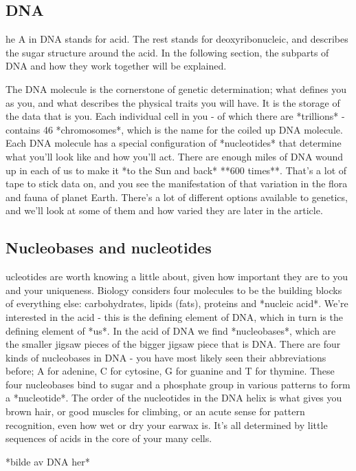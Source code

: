 \subsection*{DNA}
he A in DNA stands for acid. The rest stands for deoxyribonucleic, and describes the sugar structure around the acid. In the following section, the subparts of DNA and how they work together will be explained. 

The DNA molecule is the cornerstone of genetic determination; what defines you as you, and what describes the physical traits you will have.  It is the storage of the data that is you. Each individual cell in you - of which there are *trillions* - contains 46 *chromosomes*, which is the name for the coiled up DNA molecule. Each DNA molecule has a special configuration of *nucleotides* that determine what you'll look like and how you'll act. There are enough miles of DNA wound up in each of us to make it *to the Sun and back* **600 times**. That's a lot of tape to stick data on, and you see the manifestation of that variation in the flora and fauna of planet Earth. There's a lot of different options available to genetics, and we'll look at some of them and how varied they are later in the article. 

\subsection*{Nucleobases and nucleotides}
ucleotides are worth knowing a little about, given how important they are to you and your uniqueness. Biology considers four molecules to be the building blocks of everything else: carbohydrates, lipids (fats), proteins and *nucleic acid*. We're interested in the acid - this is the defining element of DNA, which in turn is the defining element of *us*. In the acid of DNA we find *nucleobases*, which are the smaller jigsaw pieces of the bigger jigsaw piece that is DNA. There are four kinds of nucleobases in DNA - you have most likely seen their abbreviations before; A for adenine, C for cytosine, G for guanine and T for thymine. These four nucleobases bind to sugar and a phosphate group in various patterns to form a *nucleotide*. The order of the nucleotides in the DNA helix is what gives you brown hair, or good muscles for climbing, or an acute sense for pattern recognition, even how wet or dry your earwax is. It's all determined by little sequences of acids in the core of your many cells.

*bilde av DNA her*

